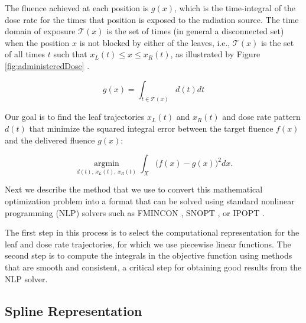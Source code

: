\documentclass{iopart}
\begin{document}
The fluence achieved at each position is $g(x)$, which is the time-integral of the dose rate for the times that position is exposed to the radiation source.
The time domain of exposure $\mathcal{T}(x)$ is the set of times (in general a disconnected set) when the position $x$ is not blocked by either of the leaves, i.e.,
$\mathcal{T}(x)$ is the set of all times $t$ such that $x_L(t) \le x \leq x_R(t)$,
as illustrated by Figure \ref{fig:administeredDose} .

\begin{equation}
g(x) = \int_{t \in \mathcal{T}(x)} d(t) dt
\label{eqn:deliveredFluenceDose}
\end{equation}

Our goal is to find the leaf trajectories $x_L(t)$ and $x_R(t)$ and dose rate pattern $d(t)$
that minimize the squared integral error between the target fluence $f(x)$ and the delivered fluence $g(x)$:

\begin{equation}
\underset{d(t), \, x_L(t), \, x_R(t)}{\operatorname{argmin}}
\int_X \bigg(f(x) - g(x)\bigg)^2 dx .
\label{eqn:fluenceMapOptimization}
\end{equation}





Next we describe the method that we use to convert this mathematical optimization problem into a format that can be solved using standard nonlinear programming (NLP) solvers such as FMINCON \cite{MatlabOptimizationToolbox2014}, SNOPT \cite{Snopt7}, or IPOPT \cite{Wachter2006}.

The first step in this process is to select the computational representation for the leaf and dose rate trajectories, for which we use piecewise linear functions. The second step is to compute the integrals in the objective function using methods that are smooth and consistent, a critical step for obtaining good results from the NLP solver.

\subsection{Spline Representation}
\end{document}
